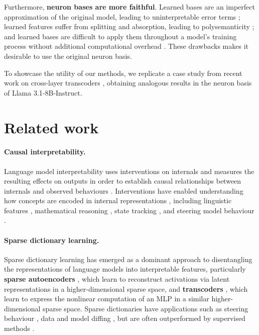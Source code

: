 \documentclass{article}
\theoremstyle{plain}
\theoremstyle{definition}
\theoremstyle{remark}
\begin{document}
Furthermore, \textbf{neuron bases are more faithful}. 
Learned bases are an imperfect approximation of the original model, leading to uninterpretable error terms
\cite{engels2025decomposing,gurnee2024sae}; learned features suffer from splitting and absorption, leading to polysemanticity \cite{bricken2023towards,chanin2025absorption}; and learned bases are difficult
to apply them throughout a model's training process without additional computational overhead \cite{minder2025robustly}. These drawbacks makes it desirable to use the original neuron basis.

To showcase the utility of our methods, we replicate a case study from recent work on cross-layer transcoders \cite{lindsey2025biology}, obtaining
analogous results in the neuron basis of Llama 3.1-8B-Instruct.

\section{Related work}

\paragraph{Causal interpretability.} Language model interpretability uses interventions on internals and measures the resulting effects on outputs in order to establish causal relationships between internals and observed behaviours \citep{giulianelli2018,vig2020investigating,geiger2021causal,meng2022locating,chan2022causal,wang2022interpretability,goldowsky2023localizing,guerner2023geometric,geiger2025causal}. Interventions have enabled understanding how concepts are encoded in internal representations \citep{geiger2024finding}, including linguistic features \citep{lasri2022probing,hanna2023when,arora2024causalgym}, mathematical reasoning \citep{wu2024identifying,baeumel2025modular}, state tracking \citep{li2025how,prakash2025language}, and steering model behaviour \citep{zou2023representation,li2023inference,wu2024reft}.

\paragraph{Sparse dictionary learning.} Sparse dictionary learning has emerged as a dominant approach to disentangling the representations of language models into interpretable features, particularly \textbf{sparse autoencoders} \citep[SAEs;][]{bricken2023towards,cunningham2023sparse,templeton2024scaling,gao2025scaling}, which learn to reconstruct activations via latent representations in a higher-dimensional sparse space, and \textbf{transcoders} \citep{dunefsky2024transcoders,ge2024automatically}, which learn to express the nonlinear computation of an MLP in a similar higher-dimensional sparse space. Sparse dictionaries have applications such as steering behaviour \citep{obrien2024steering,durmus2024steering}, data and model diffing \citep{jiang2025interpretable,minder2025robustly}, but are often outperformed by supervised methods \citep{kantamneni2025sparse,wu2025axbench}.
\end{document}
